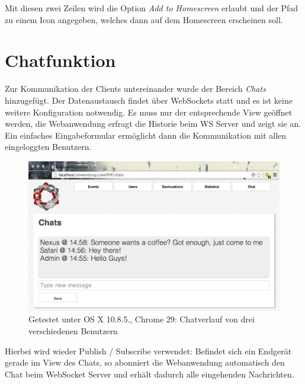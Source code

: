 Mit diesen zwei Zeilen wird die Option \emph{Add to Homescreen} erlaubt und der Pfad zu einem Icon angegeben, welches dann auf dem Homescreen erscheinen soll.


\section{Chatfunktion}
Zur Kommunikation der Clients untereinander wurde der Bereich \emph{Chats} hinzugefügt. Der Datenaustausch findet über WebSockets statt und es ist keine weitere Konfiguration notwendig. Es muss nur der entsprechende View geöffnet werden, die Webanwendung erfragt die Historie beim WS Server und zeigt sie an. Ein einfaches Eingabeformular ermöglicht dann die Kommunikation mit allen eingeloggten Benutzern.

\begin{figure}[!ht]
	\centering
	\includegraphics[width=15cm]{fig/screenshot_chat}
	\caption[Beispielansicht der Chats]{Getestet unter OS X 10.8.5., Chrome 29: Chatverlauf von drei verschiedenen Benutzern}
\end{figure}

Hierbei wird wieder Publish / Subscribe verwendet: Befindet sich ein Endgerät gerade im View des Chats, so abonniert die Webanwendung automatisch den Chat beim WebSocket Server und erhält dadurch alle eingehenden Nachrichten.


